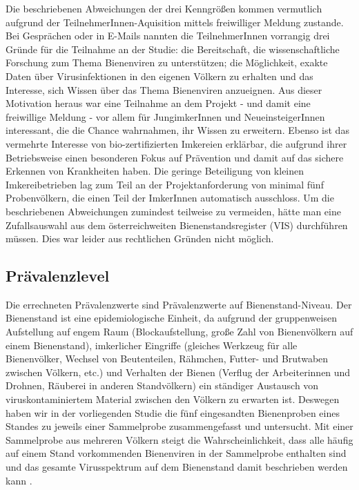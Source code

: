 Die beschriebenen Abweichungen der drei Kenngrößen kommen vermutlich aufgrund der Teil\-nehmerInnen-Aquisition mittels freiwilliger Meldung zustande. Bei Gesprächen oder in E-Mails nannten die TeilnehmerInnen vorrangig drei Gründe für die Teilnahme an der Studie: die Bereitschaft, die wissenschaftliche Forschung zum Thema Bienenviren zu unterstützen; die Möglichkeit, exakte Daten über Virusinfektionen in den eigenen Völkern zu erhalten und das Interesse, sich Wissen über das Thema Bienenviren anzueignen. Aus dieser Motivation heraus war eine Teilnahme an dem Projekt - und damit eine freiwillige Meldung - vor allem für JungimkerInnen und NeueinsteigerInnen interessant, die die Chance wahrnahmen, ihr Wissen zu erweitern. Ebenso ist das vermehrte Interesse von bio-zertifizierten Imkereien erklärbar, die aufgrund ihrer Betriebsweise einen besonderen Fokus auf Prävention und damit auf das sichere Erkennen von Krankheiten haben. Die geringe Beteiligung von kleinen Imkereibetrieben lag zum Teil an der Projektanforderung von minimal fünf Probenvölkern, die einen Teil der ImkerInnen automatisch ausschloss. Um die beschriebenen Abweichungen zumindest teilweise zu vermeiden, hätte man eine Zufallsauswahl aus dem österreichweiten Bienenstandsregister (VIS) durchführen müssen. Dies war leider aus rechtlichen Gründen nicht möglich.

\subsection{Prävalenzlevel}

Die errechneten Prävalenzwerte sind Prävalenzwerte auf Bienenstand-Niveau. Der Bienenstand ist eine epidemiologische Einheit, da aufgrund der gruppenweisen Aufstellung auf engem Raum (Blockaufstellung, große Zahl von Bienenvölkern auf einem Bienenstand), imkerlicher Eingriffe (gleiches Werkzeug für alle Bienenvölker, Wechsel von Beutenteilen, Rähmchen, Futter- und Brutwaben zwischen Völkern, etc.) und Verhalten der Bienen (Verflug der Arbeiterinnen und Drohnen, Räuberei in anderen Standvölkern) ein ständiger Austausch von viruskontaminiertem Material zwischen den Völkern zu erwarten ist. Deswegen haben wir in der vorliegenden Studie die fünf eingesandten Bienenproben eines Standes zu jeweils einer Sammelprobe zusammengefasst und untersucht. Mit einer Sammelprobe aus mehreren Völkern steigt die Wahrscheinlichkeit, dass alle häufig auf einem Stand vorkommenden Bienenviren in der Sammelprobe enthalten sind und das gesamte Virusspektrum auf dem Bienenstand damit beschrieben werden kann \citep{tentcheva2004,mouret2013}.

